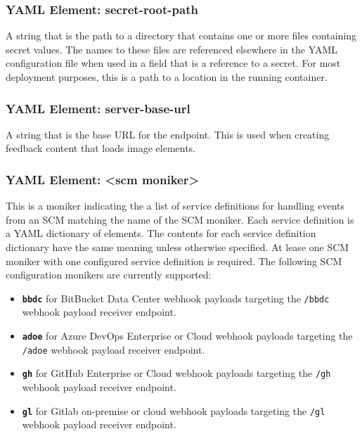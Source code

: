 
\subsubsection{YAML Element: secret-root-path}\label{sec:yaml-secret-root-path}

A string that is the path to a directory that contains one or more files containing secret values.  The names to these files are 
referenced elsewhere in the YAML configuration file when used in a field that is a reference to a secret.  For most deployment
purposes, this is a path to a location in the \cxoneflow running container.

\subsubsection{YAML Element: server-base-url}\label{sec:yaml-server-base-url}
A string that is the base URL for the \cxoneflow endpoint.  This is used when creating feedback content that loads image elements.

\subsubsection{YAML Element: <scm moniker>}\label{sec:yaml-scm-monikers}

This is a moniker indicating the a list of service definitions for handling events from an SCM matching the name of the SCM
moniker.  Each service definition is a YAML dictionary of elements. The contents for each service definition dictionary 
have the same meaning unless otherwise specified.  At lease one SCM moniker with one configured service definition is required. 
The following SCM configuration monikers are currently supported:

\begin{itemize}
    \item \textbf{\texttt{bbdc}} for BitBucket Data Center webhook payloads targeting the \texttt{/bbdc}
    webhook payload receiver endpoint.
    \item \textbf{\texttt{adoe}} for Azure DevOps Enterprise or Cloud webhook payloads targeting the \texttt{/adoe}
    webhook payload receiver endpoint.
    \item \textbf{\texttt{gh}} for GitHub Enterprise or Cloud webhook payloads targeting the \texttt{/gh}
    webhook payload receiver endpoint.
    \item \textbf{\texttt{gl}} for Gitlab on-premise or cloud webhook payloads targeting the \texttt{/gl}
    webhook payload receiver endpoint.
\end{itemize}

